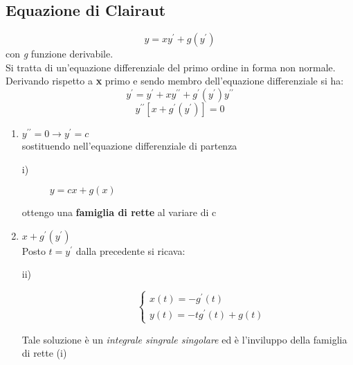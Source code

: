 \subsection{Equazione di Clairaut}
\begin{equation*}
	y=xy^\prime+g(y^\prime)
\end{equation*}
con \textit{g} funzione derivabile.\\
Si tratta di un'equazione differenziale del primo ordine in forma non normale. Derivando rispetto a \textbf{x} primo e sendo membro dell'equazione differenziale si ha:
\begin{equation*}
	y^\prime=y^\prime+xy^{\prime\prime}+g^\prime(y^\prime)y^{\prime\prime}
\end{equation*}
 \begin{equation*}
	y^{\prime\prime}[x+g^\prime(y^\prime)]=0
\end{equation*}
\begin{enumerate}
	\item $y^{\prime\prime}=0\to y^\prime=c$\\
	sostituendo nell'equazione differenziale di partenza
	\begin{description}
		\item[i) ] $y=cx+g(x)$ 
	\end{description}
	ottengo una \textbf{famiglia di rette} al variare di c
	\item $x+g^\prime(y^\prime)$\\
		Posto $t=y^\prime$ dalla precedente si ricava:
		\begin{description}
			\item[ii) ]\begin{equation*}
				\begin{cases}
					x(t)=-g^\prime(t)\\
					y(t)=-tg^\prime(t)+g(t)
				\end{cases}
			\end{equation*} 
 		\end{description}
		Tale soluzione è un \textit{integrale singrale singolare} ed è l'inviluppo della famiglia di rette (i)
\end{enumerate}
